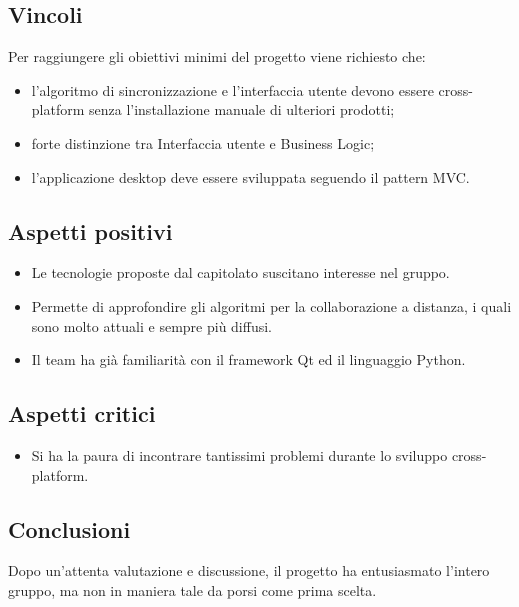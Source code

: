 \subsection{Vincoli}
Per raggiungere gli obiettivi minimi del progetto viene richiesto che:
\begin{itemize}
	\item l'algoritmo di sincronizzazione e l'interfaccia utente devono essere cross-platform senza l'installazione manuale di ulteriori prodotti;
	\item forte distinzione tra Interfaccia utente e
	Business Logic;
	\item l'applicazione desktop deve essere sviluppata seguendo il pattern MVC.
\end{itemize}

\subsection{Aspetti positivi}
\begin{itemize}
	\item Le tecnologie proposte dal capitolato suscitano interesse nel gruppo.
	\item Permette di approfondire gli algoritmi per la collaborazione a distanza, i quali sono molto attuali e sempre più diffusi.
	\item Il team ha già familiarità con il framework Qt ed il linguaggio Python.
\end{itemize}

\subsection{Aspetti critici}
\begin{itemize}
	\item Si ha la paura di incontrare tantissimi problemi durante lo sviluppo cross-platform.
\end{itemize}

\subsection{Conclusioni}
Dopo un'attenta valutazione e discussione, il progetto ha entusiasmato l'intero gruppo, ma non in maniera tale da porsi come prima scelta.
